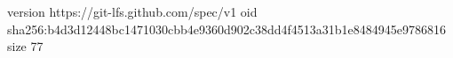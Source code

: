 version https://git-lfs.github.com/spec/v1
oid sha256:b4d3d12448bc1471030cbb4e9360d902c38dd4f4513a31b1e8484945e9786816
size 77
